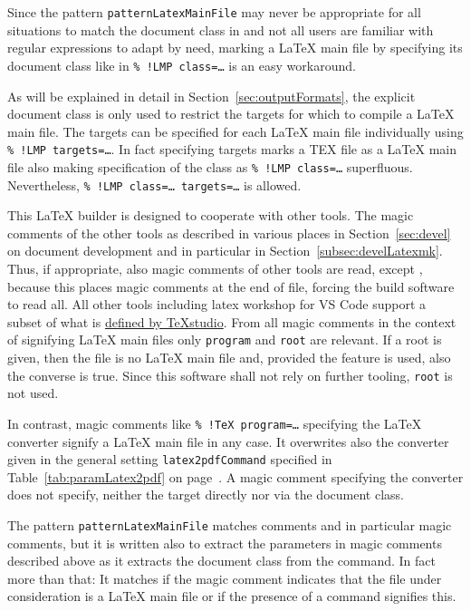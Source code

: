 Since the pattern \texttt{patternLatexMainFile} may never be appropriate for all situations 
to match the document class in  
and not all users are familiar with regular expressions to adapt by need, 
marking a \LaTeX{} main file by specifying its document class like in 
\texttt{\%~!LMP class=\dots} is an easy workaround. 

As will be explained in detail in Section~\ref{sec:outputFormats}, 
the explicit document class is only used 
to restrict the targets for which to compile a \LaTeX{} main file. 
The targets can be specified for each \LaTeX{} main file individually 
using \texttt{\%~!LMP targets=\dots}. 
In fact specifying targets marks a TEX file as a \LaTeX{} main file also 
making specification of the class as \texttt{\%~!LMP class=\dots} superfluous. 
Nevertheless, \texttt{\%~!LMP class=\dots\ targets=\dots} is allowed. 

This \LaTeX{} builder is designed to cooperate with other tools. 
The magic comments of the other tools as described in various places in Section~\ref{sec:devel} 
on document development and in particular in Section~\ref{subsec:develLatexmk}. 
Thus, if appropriate, also magic comments of other tools are read, 
except \auctex, because this places magic comments at the end of file, 
forcing the build software to read all. 
All other tools including latex workshop for VS Code 
support a subset of what is 
\href{http://transit.iut2.upmf-grenoble.fr/doc/texstudio/html/usermanual_en.html#TEXCOM}%
{defined by \TeX{}studio}. 
From all magic comments in the context of signifying \LaTeX{} main files 
only \texttt{program} and \texttt{root} are relevant. 
If a root is given, then the file is no \LaTeX{} main file 
and, provided the feature is used, also the converse is true. 
Since this software shall not rely on further tooling, 
\texttt{root} is not used. 

In contrast, magic comments like \texttt{\%~!TeX program=\dots} 
specifying the \LaTeX{} converter signify a \LaTeX{} main file in any case. 
It overwrites also the converter 
given in the general setting \texttt{latex2pdfCommand} 
specified in Table~\ref{tab:paramLatex2pdf} on page~\pageref{tab:paramLatex2pdf}. 
A magic comment specifying the converter does not specify, 
neither the target directly nor via the document class. 


The pattern \texttt{patternLatexMainFile} matches comments and in particular magic comments, 
but it is written also to extract the parameters in magic comments described above 
as it extracts the document class from the  command. 
In fact more than that: 
It matches if the magic comment indicates 
that the file under consideration is a \LaTeX{} main file 
or if the presence of a  command signifies this. 

